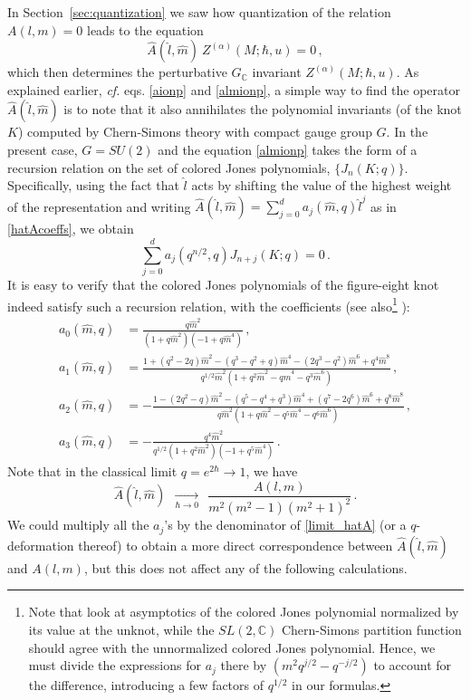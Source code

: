 \documentclass[hyper]{JHEP3}
\newcommand{\C}{{\mathbb{C}}}
\newcommand\be{\begin{equation}}
\newcommand\ee{\end{equation}}
\begin{document}
In Section~\ref{sec:quantization} we saw how quantization of the relation $A(l,m) = 0$
leads to the equation
\be
\widehat{A} (\hat l, \hat m ) ~Z^{(\alpha)} (M;\hbar,u) = 0\,,
\label{AZquantum}
\ee
which then determines the perturbative $G_{\C}$ invariant $Z^{(\alpha)} (M;\hbar,u)$.
As explained earlier, {\it cf.} eqs. \eqref{aionp} and \eqref{almionp},
a simple way to find the operator $\widehat{A} (\hat l, \hat m )$
is to note that it also annihilates the polynomial invariants (of the knot $K$)
computed by Chern-Simons theory with compact gauge group $G$.
In the present case, $G = SU(2)$ and the equation \eqref{almionp}
takes the form of a recursion relation on the set of colored Jones
polynomials, $\{ J_n (K;q) \}$.
Specifically, using the fact that $\hat l$ acts by shifting the value of
the highest weight of the representation
and writing $\widehat{A} (\hat{l},\hat{m}) = \sum_{j=0}^d a_j(\hat{m},q) \hat{l}^j$
as in \eqref{hatAcoeffs}, we obtain
\be
\sum_{j=0}^d a_j (q^{n/2}, q) J_{n+j} (K;q) = 0\,.
\ee
It is easy to verify that the colored Jones polynomials of the figure-eight
knot indeed satisfy such a recursion relation, with the coefficients
(see also\footnote{Note that \cite{garoufalidis-2004, garoufalidis-2006} look at asymptotics
of the colored Jones polynomial normalized by its value at the unknot,
while the $SL(2,\C)$ Chern-Simons partition function should agree with
the {unnormalized} colored Jones polynomial.
Hence, we must divide the expressions for $a_j$ there by $(m^2 q^{j/2} - q^{-j/2})$
to account for the difference, introducing a few factors
of $q^{1/2}$ in our formulas.}
\cite{garoufalidis-2004, garoufalidis-2006}):
\begin{subequations} \label{Aj}
\begin{align}
a_0(\hat{m},q) & = \frac{q\hat{m}^2}{(1+q\hat{m}^2)(-1+q\hat{m}^4)}\,, \\
a_1(\hat{m},q) & = \frac{1+(q^2-2q)\hat{m}^2-(q^3-q^2+q)\hat{m}^4-(2q^3-q^2)\hat{m}^6
+q^4\hat{m}^8}{q^{1/2}\hat{m}^2(1+q^2\hat{m}^2-q\hat{m}^4-q^3\hat{m}^6)}\,, \\
a_2(\hat{m},q) & = -\frac{1-(2q^2-q)\hat{m}^2-(q^5-q^4+q^3)\hat{m}^4+(q^7-2q^6)\hat{m}^6
+q^8\hat{m}^8}{q\hat{m}^2(1+q\hat{m}^2-q^5\hat{m}^4-q^6\hat{m}^6)}\,, \\
a_3(\hat{m},q) & = -\frac{q^4\hat{m}^2}{q^{1/2}(1+q^2\hat{m}^2)(-1+q^5\hat{m}^4)}\,.
\end{align}
\end{subequations}
Note that in the classical limit $q = e^{2\hbar} \to 1$, we have
\be
\widehat{A} (\hat{l},\hat{m}) ~~\underset{\hbar \to 0}{\longrightarrow}~~ \frac{A(l,m)}{m^2(m^2-1)(m^2+1)^2}\,.
\label{limit_hatA}
\ee
We could multiply all the $a_j$'s by the denominator of \eqref{limit_hatA}
(or a $q$-deformation thereof) to obtain a more direct correspondence
between $\widehat{A} (\hat{l},\hat{m})$ and $A(l,m)$,
but this does not affect any of the following calculations.
\end{document}

